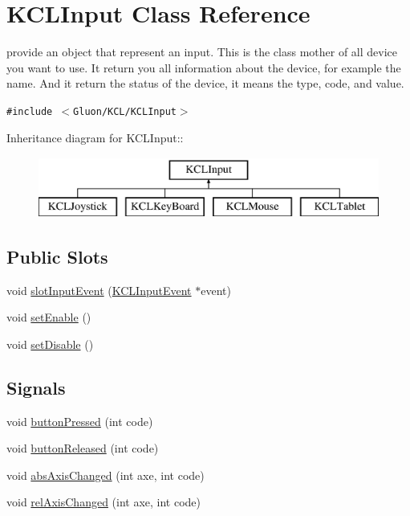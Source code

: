 \hypertarget{class_k_c_l_input}{
\section{KCLInput Class Reference}
\label{class_k_c_l_input}
}
provide an object that represent an input. This is the class mother of all device you want to use. It return you all information about the device, for example the name. And it return the status of the device, it means the type, code, and value.  


{\tt \#include $<$Gluon/KCL/KCLInput$>$}

Inheritance diagram for KCLInput::\begin{figure}[H]
\begin{center}
\leavevmode
\includegraphics[height=2cm]{class_k_c_l_input}
\end{center}
\end{figure}
\subsection*{Public Slots}
\begin{CompactItemize}
\item 
void \hyperlink{class_k_c_l_input_09e6f283721d38bb9aa2a703d6a735c6}{slotInputEvent} (\hyperlink{class_k_c_l_input_event}{KCLInputEvent} $\ast$event)
\item 
void \hyperlink{class_k_c_l_input_7b6f5e42d88e677d371e615fa686e79e}{setEnable} ()
\item 
void \hyperlink{class_k_c_l_input_496552a75e1e157f134e4e0739d25895}{setDisable} ()
\end{CompactItemize}
\subsection*{Signals}
\begin{CompactItemize}
\item 
void \hyperlink{class_k_c_l_input_b82e826fcc0f790ff153c5e4ac074344}{buttonPressed} (int code)
\item 
void \hyperlink{class_k_c_l_input_1192fa591312c7cda431b9cf9b442344}{buttonReleased} (int code)
\item 
void \hyperlink{class_k_c_l_input_4c1dcd58b3d59b6f2dc059d65b5012e4}{absAxisChanged} (int axe, int code)
\item 
void \hyperlink{class_k_c_l_input_ff1ef872aecc7cd81660f2410cd53246}{relAxisChanged} (int axe, int code)
\end{CompactItemize}
